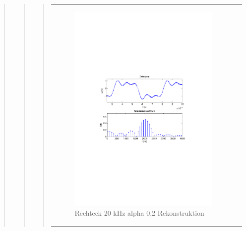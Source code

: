 \begin{quote}
\begin{quote}
\begin{quote}
\begin{center}
\begin{tabular}{ll}
            \hspace{-5cm}
                \begin{minipage}{0.6\textwidth}
                    \begin{figure}[H]
                        \includegraphics[scale=0.7, trim = 35mm 100mm 35mm 95mm, clip]{Bilder/shaperec20_02}
                          \caption{Rechteck 20 kHz alpha 0,2 Rekonstruktion}
		                  \label{fig:shaperec20_02}
                    \end{figure}
                \end{minipage}
                

\end{tabular}
\end{center}
\end{quote}
\end{quote}
\end{quote}

